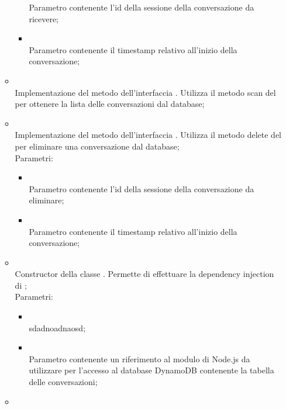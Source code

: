 \begin{itemize}
\begin{itemize}
\begin{itemize}
			Parametro contenente l'id della sessione della conversazione da ricevere;
			\item {} \\
			Parametro contenente il timestamp relativo all'inizio della conversazione;
		\end{itemize}
		\item[]  \\
		Implementazione del metodo dell'interfaccia . Utilizza il metodo scan del  per ottenere la lista delle conversazioni dal database;\\
		\item[]  \\
		Implementazione del metodo dell'interfaccia . Utilizza il metodo delete del  per eliminare una conversazione dal database;\\
		Parametri:
		\begin{itemize}
			\item {} \\
			Parametro contenente l'id della sessione della conversazione da eliminare;
			\item {} \\
			Parametro contenente il timestamp relativo all'inizio della conversazione;
		\end{itemize}
		\item[]  \\
		Constructor della classe . Permette di effettuare la dependency injection di ;\\
		Parametri:
		\begin{itemize}
			\item {} \\
			sdadnoadnaosd;
			\item {} \\
			Parametro contenente un riferimento al modulo di Node.js da utilizzare per l'accesso al database DynamoDB contenente la tabella delle conversazioni;
		\end{itemize}
		\item[]  \\

\end{itemize}
\end{itemize}
